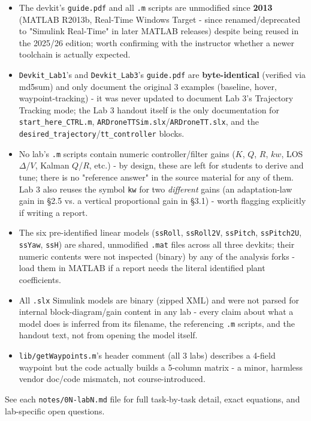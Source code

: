 \documentclass[11pt]{article}
\begin{document}
\begin{itemize}
\item The devkit's \texttt{guide.pdf} and all \texttt{.m} scripts are unmodified since \textbf{2013} (MATLAB R2013b, Real-Time Windows Target - since renamed/deprecated to "Simulink Real-Time" in later MATLAB releases) despite being reused in the 2025/26 edition; worth confirming with the instructor whether a newer toolchain is actually expected.
\item \texttt{Devkit\_\allowbreak{}Lab1}'s and \texttt{Devkit\_\allowbreak{}Lab3}'s \texttt{guide.pdf} are \textbf{byte-identical} (verified via md5sum) and only document the original 3 examples (baseline, hover, waypoint-tracking) - it was never updated to document Lab 3's Trajectory Tracking mode; the Lab 3 handout itself is the only documentation for \texttt{start\_\allowbreak{}here\_\allowbreak{}CTRL.m}, \texttt{ARDroneTTSim.slx}/\texttt{ARDroneTT.slx}, and the \texttt{desired\_\allowbreak{}trajectory}/\texttt{tt\_\allowbreak{}controller} blocks.
\item No lab's \texttt{.m} scripts contain numeric controller/filter gains ($K$, $Q$, $R$, $kw$, LOS $\Delta$/$V$, Kalman $Q$/$R$, etc.) - by design, these are left for students to derive and tune; there is no "reference answer" in the source material for any of them. Lab 3 also reuses the symbol \texttt{kw} for two \textit{different} gains (an adaptation-law gain in §2.5 vs. a vertical proportional gain in §3.1) - worth flagging explicitly if writing a report.
\item The six pre-identified linear models (\texttt{ssRoll}, \texttt{ssRoll2V}, \texttt{ssPitch}, \texttt{ssPitch2U}, \texttt{ssYaw}, \texttt{ssH}) are shared, unmodified \texttt{.mat} files across all three devkits; their numeric contents were not inspected (binary) by any of the analysis forks - load them in MATLAB if a report needs the literal identified plant coefficients.
\item All \texttt{.slx} Simulink models are binary (zipped XML) and were not parsed for internal block-diagram/gain content in any lab - every claim about what a model does is inferred from its filename, the referencing \texttt{.m} scripts, and the handout text, not from opening the model itself.
\item \texttt{lib/getWaypoints.m}'s header comment (all 3 labs) describes a 4-field waypoint but the code actually builds a 5-column matrix - a minor, harmless vendor doc/code mismatch, not course-introduced.
\end{itemize}

See each \texttt{notes/0N-labN.md} file for full task-by-task detail, exact equations, and lab-specific open questions.
\end{document}
